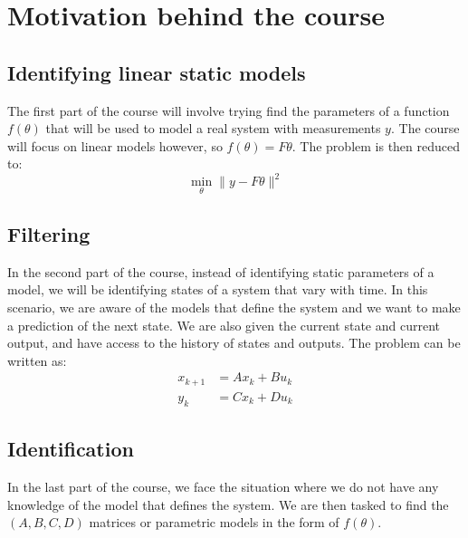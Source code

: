 \section{Motivation behind the course}
\subsection{Identifying linear static models}
The first part of the course will involve trying find the parameters of a function $f(\theta)$ that will be used to model a real system with measurements $y$. The course will focus on linear models however, so $f(\theta) = F\theta$. The problem is then reduced to: 
\begin{equation}
	\min_{\theta} \|y - F\theta\|^{2}
\end{equation}
\subsection{Filtering} 
In the second part of the course, instead of identifying static parameters of a model, we will be identifying states of a system that vary with time. In this scenario, we are aware of the models that define the system and we want to make a prediction of the next state. We are also given the current state and current output, and have access to the history of states and outputs. The problem can be written as: 
\begin{align}
	x_{k+1} &= Ax_{k} + Bu_{k}\\
	y_{k} &= Cx_{k} + Du_{k}
\end{align} 
\subsection{Identification} 
In the last part of the course, we face the situation where we do not have any knowledge of the model that defines the system. We are then tasked to find the $(A, B, C, D)$ matrices or parametric models in the form of $f(\theta)$. 

